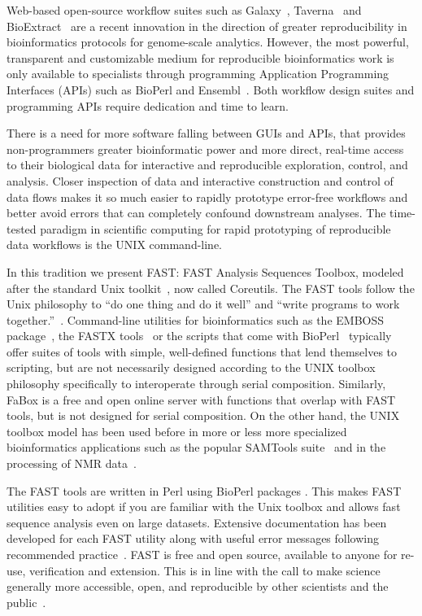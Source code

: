 \documentclass{frontiersSCNS} %
\begin{document}
Web-based open-source workflow suites such as Galaxy~\citep{galaxy14},
Taverna~\citep{CPE:CPE993} and BioExtract~\citep{Lushbough01072011}
are a recent innovation in the direction of greater reproducibility in
bioinformatics protocols for genome-scale analytics. However, the most
powerful, transparent and customizable medium for reproducible
bioinformatics work is only available to specialists through
programming Application Programming Interfaces (APIs) such as BioPerl
and Ensembl~\citep{Yates01012015}. Both workflow design suites and
programming APIs require dedication and time to learn.

There is a need for more software falling between GUIs and APIs, that
provides non-programmers greater bioinformatic power and more direct,
real-time access to their biological data for interactive and
reproducible exploration, control, and analysis. Closer inspection of
data and interactive construction and control of data flows makes it
so much easier to rapidly prototype error-free workflows and better
avoid errors that can completely confound downstream analyses.  The
time-tested paradigm in scientific computing for rapid prototyping of
reproducible data workflows is the UNIX command-line.

In this tradition we present FAST: FAST Analysis Sequences Toolbox,
modeled after the standard Unix toolkit~\citep{Peek2001}, now called
Coreutils. The FAST tools follow the Unix philosophy to ``do one thing
and do it well'' and ``write programs to work
together.''~\citep{Stutz2000}. Command-line utilities for
bioinformatics such as the EMBOSS package~\citep{Rice2000}, the FASTX
tools~\citep{fastx} or the scripts that come with
BioPerl~\citep{Stajich2002} typically offer suites of tools with
simple, well-defined functions that lend themselves to scripting, but
are not necessarily designed according to the UNIX toolbox philosophy
specifically to interoperate through serial composition. Similarly,
FaBox is a free and open online server with functions that overlap
with FAST tools, but is not designed for serial composition. On the
other hand, the UNIX toolbox model has been used before in more or
less more specialized bioinformatics applications such as the popular
SAMTools suite~\citep{Li15082009} and in the processing of NMR
data~\citep{delaglio1995nmrpipe}.

The FAST tools are written in Perl using BioPerl packages
\citep{Stajich2002}. This makes FAST utilities easy to adopt if you
are familiar with the Unix toolbox and allows fast sequence analysis
even on large datasets. Extensive documentation has been developed for
each FAST utility along with useful error messages following
recommended practice~\citep{Seemann2013}. FAST is free and open
source, available to anyone for re-use, verification and
extension. This is in line with the call to make science generally
more accessible, open, and reproducible by other scientists and the
public~\citep{Groves2012}.
\end{document}
